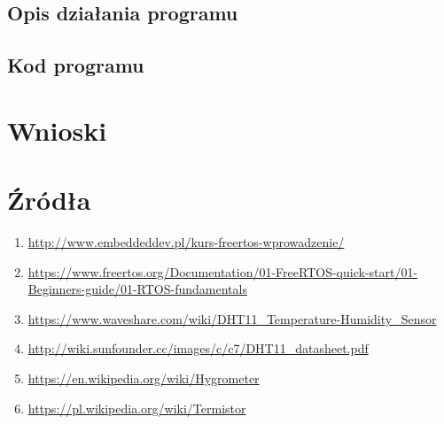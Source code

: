 \documentclass{article}
\begin{document}
        \subsection{Opis działania programu}
        \subsection{Kod programu}
    \section{Wnioski}
    \section{Źródła}
        \begin{enumerate}[label=\arabic*.]
            \item \url{http://www.embeddeddev.pl/kurs-freertos-wprowadzenie/}
            \item \url{https://www.freertos.org/Documentation/01-FreeRTOS-quick-start/01-Beginners-guide/01-RTOS-fundamentals}
            \item \url{https://www.waveshare.com/wiki/DHT11_Temperature-Humidity_Sensor}
            \item \url{http://wiki.sunfounder.cc/images/c/c7/DHT11_datasheet.pdf} \label{src:datasheet}
            \item \url{https://en.wikipedia.org/wiki/Hygrometer}
            \item \url{https://pl.wikipedia.org/wiki/Termistor}
        \end{enumerate}
\end{document}
